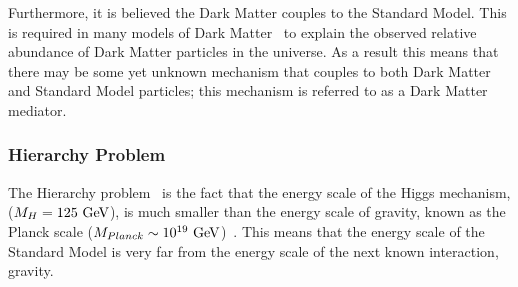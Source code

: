 Furthermore, it is believed the Dark Matter couples to the Standard Model.
This is required in many models of Dark Matter~\cite{theo-bsm_dm_feng} to explain the
observed relative abundance of Dark Matter particles in the universe.
As a result this means that there may be some yet unknown mechanism that couples to both Dark Matter and
Standard Model particles; this mechanism is referred to as a Dark Matter mediator.


\subsubsection{Hierarchy Problem}

The Hierarchy problem~\cite{theo-hierarchy} is the fact that the energy scale of the Higgs mechanism, ($M_{H}\nobreak=\nobreak125~\text{GeV}$),
is much smaller than the energy scale of gravity,
known as the Planck scale ($M_{Planck}\nobreak\sim\nobreak10^{19}~\text{GeV}$)~\cite{obj-bjets_PDG}.
This means that the energy scale of the Standard Model is very far
from the energy scale of the next known interaction, gravity.

